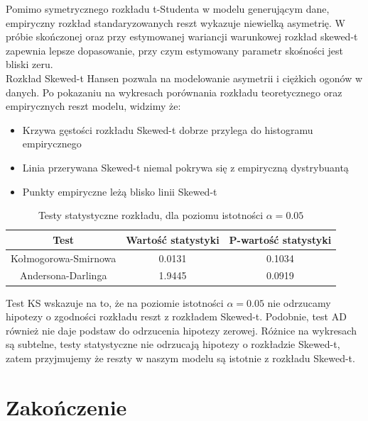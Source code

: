 \documentclass{article}
\begin{document}
{Pomimo symetrycznego rozkładu t-Studenta w modelu generującym dane, empiryczny rozkład standaryzowanych reszt wykazuje niewielką asymetrię. W próbie skończonej oraz przy estymowanej wariancji warunkowej rozkład skewed-t zapewnia lepsze dopasowanie, przy czym estymowany parametr skośności jest bliski zeru. \\

Rozkład Skewed-t Hansen pozwala na modelowanie asymetrii i ciężkich ogonów w danych. Po pokazaniu na wykresach porównania rozkładu teoretycznego oraz empirycznych reszt modelu, widzimy że: 
\begin{itemize}
    \item Krzywa gęstości rozkładu Skewed-t dobrze przylega do histogramu empirycznego 
    \item Linia przerywana Skewed-t niemal pokrywa się z empiryczną dystrybuantą
    \item Punkty empiryczne leżą blisko linii Skewed-t
\end{itemize}

\begin{table}[h]
    \centering
    \caption{Testy statystyczne rozkładu, dla poziomu istotności $\alpha = 0.05$}
    \begin{tabular}{|c|c|c|}
    \hline
    \textbf{Test} & \textbf{Wartość statystyki} & \textbf{P-wartość statystyki}\\
    \hline
    Kołmogorowa-Smirnowa & 0.0131 & 0.1034 \\
    Andersona-Darlinga & 1.9445 & 0.0919 \\
    \hline
    \end{tabular}
\end{table} 

Test KS wskazuje na to, że na poziomie istotności $\alpha = 0.05$ nie odrzucamy hipotezy o zgodności rozkładu reszt z rozkładem Skewed-t. Podobnie, test AD również nie daje podstaw do odrzucenia hipotezy zerowej. Różnice na wykresach są subtelne, testy statystyczne nie odrzucają hipotezy o rozkładzie Skewed-t, zatem przyjmujemy że reszty w naszym modelu są istotnie z rozkładu Skewed-t. 

\section{Zakończenie}
}
\end{document}
